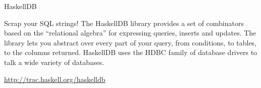 \begin{hcarentry}{HaskellDB}
\makeheader 

Scrap your SQL strings! The HaskellDB library provides a set of
combinators based on the ``relational algebra'' for expressing
queries, inserts and updates. The library lets you abstract over
every part of your query, from conditions, to tables, to the columns
returned. HaskellDB uses the HDBC family of database drivers to talk a
wide variety of databases.

\FurtherReading
  \url{http://trac.haskell.org/haskelldb}
\end{hcarentry}
